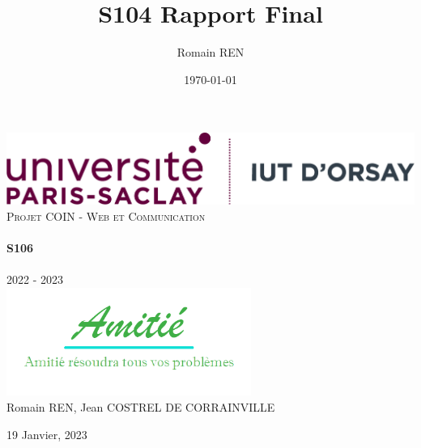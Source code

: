 \documentclass[12pt]{article}
\title{S104 Rapport Final}
\author{Romain REN}
\date{\today}
\begin{document}
    \pagestyle{fancy}
    \fancyhf{}
    
    \begin{titlepage}
    \vbox{ }

    \begin{center}
        \includegraphics[width=1\textwidth]{logo-iutorsay.png}\\[4cm]
        \textsc{\Large Projet COIN - Web et Communication}\\[0.7cm]

        \noindent\makebox[\linewidth]{\rule{.7\paperwidth}{.6pt}}\\[0.7cm]
        { \huge \bfseries S106}\\[0.25cm]
        \noindent\makebox[\linewidth]{\rule{.7\paperwidth}{.6pt}}\\[0.7cm]
        \large{2022 - 2023}\\[1.2cm]
        \includegraphics[width=0.6\textwidth]{logo_transp.png}\\[4cm]
        \vfill
        \large
        Romain REN, Jean COSTREL DE CORRAINVILLE

        {\large 19 Janvier, 2023}
    \end{center}
    \end{titlepage}
    
\end{document}
